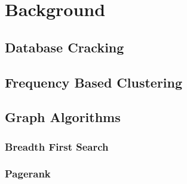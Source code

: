 \chapter{Background}

\label{ch:background}

\section{Database Cracking}

\section{Frequency Based Clustering}

\section{Graph Algorithms}

\subsection{Breadth First Search}

\subsection{Pagerank}

